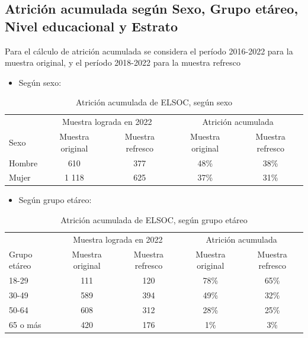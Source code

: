 \documentclass[
  12pt,
]{book}
\providecommand{\tightlist}{%
  \setlength{\itemsep}{0pt}\setlength{\parskip}{0pt}}
\begin{document}
\hypertarget{atriciuxf3n-acumulada-seguxfan-sexo-grupo-etuxe1reo-nivel-educacional-y-estrato}{%
\subsection*{Atrición acumulada según Sexo, Grupo etáreo, Nivel educacional y Estrato}\label{atriciuxf3n-acumulada-seguxfan-sexo-grupo-etuxe1reo-nivel-educacional-y-estrato}}

Para el cálculo de atrición acumulada se considera el período 2016-2022 para la muestra original, y el período 2018-2022 para la muestra refresco

\begin{itemize}
\tightlist
\item
  Según sexo:
\end{itemize}

\begin{table}

\caption{\label{tab:tabla-atricion-sexo}Atrición acumulada de ELSOC, según sexo}
\centering
\begin{tabular}[t]{l|c|c|c|c}
\hline
\multicolumn{1}{c|}{ } & \multicolumn{2}{c|}{Muestra lograda en 2022} & \multicolumn{2}{c}{Atrición acumulada} \\
\cline{2-3} \cline{4-5}
Sexo & Muestra original & Muestra refresco & Muestra original & Muestra refresco\\
\hline
Hombre & 610 & 377 & 48\% & 38\%\\
\hline
Mujer & 1 118 & 625 & 37\% & 31\%\\
\hline
\end{tabular}
\end{table}

\begin{itemize}
\tightlist
\item
  Según grupo etáreo:
\end{itemize}

\begin{table}

\caption{\label{tab:tabla-atricion-edad}Atrición acumulada de ELSOC, según grupo etáreo}
\centering
\begin{tabular}[t]{l|c|c|c|c}
\hline
\multicolumn{1}{c|}{ } & \multicolumn{2}{c|}{Muestra lograda en 2022} & \multicolumn{2}{c}{Atrición acumulada} \\
\cline{2-3} \cline{4-5}
Grupo etáreo & Muestra original & Muestra refresco & Muestra original & Muestra refresco\\
\hline
18-29 & 111 & 120 & 78\% & 65\%\\
\hline
30-49 & 589 & 394 & 49\% & 32\%\\
\hline
50-64 & 608 & 312 & 28\% & 25\%\\
\hline
65 o más & 420 & 176 & 1\% & 3\%\\
\hline
\end{tabular}
\end{table}
\end{document}
